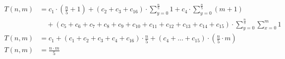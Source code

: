 \begin{subequations}
\begin{align}
\label{eq:findedgels1}
T(n,m)& =
c_1 \cdot (\frac{n}{5} + 1) + (c_2 + c_3 + c_{16}) \cdot \sum_{y=0}^{\frac{n}{5}} 1
 + c_4 \cdot \sum_{y=0}^{\frac{n}{5}} (m+1) \\
& \quad + (c_5 + c_6 + c_7 + c_8 + c_9 + c_{10} + c_{11} + c_{12} + c_{13} + c_{14} + c_{15})
 \cdot \sum_{y=0}^{\frac{n}{5}} \sum_{x=0}^{m} 1 \nonumber \\
\label{eq:findedgels2}
T(n,m)& = c_1 + (c_1 + c_2 + c_3 + c_4 + c_{16}) \cdot \frac{n}{5} + (c_4 + \ldots + c_{15})
\cdot (\frac{n}{5} \cdot m) \\
\label{eq:findedgels3}
T(n,m)& = \frac{n \cdot m}{5}
\end{align}
\end{subequations}
